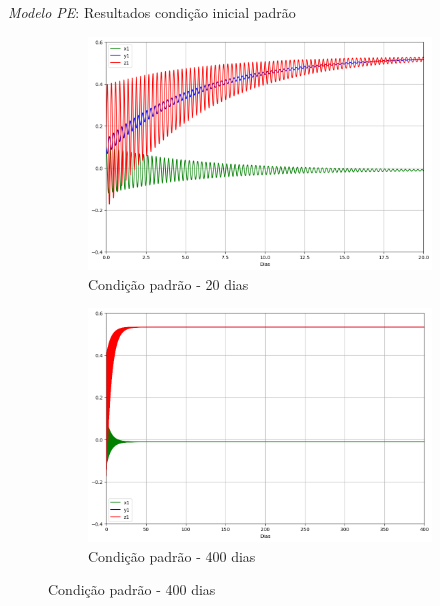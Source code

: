 
\begin{frame}{\textit{Modelo PE}: Resultados condição inicial padrão}
	\begin{figure}
		\centering
		\begin{subfigure}[b]{0.45\textwidth}
			\centering
			\includegraphics[width=\textwidth]{img/p01d20.png}
			\caption{Condição padrão - 20 dias}
			\label{fig:p01d20}
		\end{subfigure}
		\hfill
		\begin{subfigure}[b]{0.45\textwidth}
			\centering
			\includegraphics[width=\textwidth]{img/p01d400.png}
			\caption{Condição padrão - 400 dias}
			\label{fig:p01d400}
		\end{subfigure}
	\end{figure}
\end{frame}



